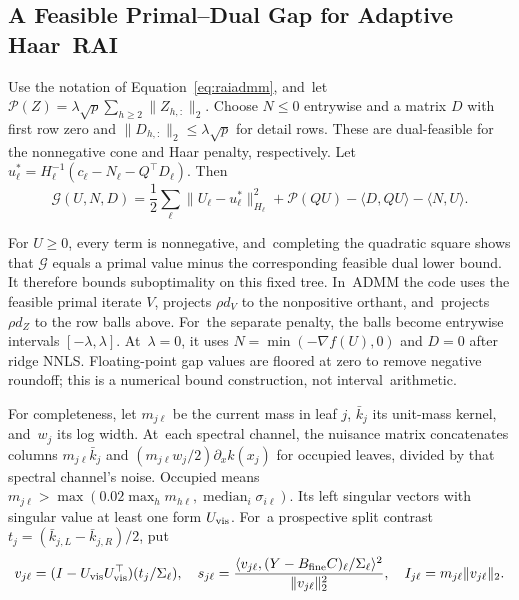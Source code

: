 \documentclass[mathematics,article,accept,moreauthors]{Definitions/mdpi}
\begin{document}
\subsection{A Feasible Primal--Dual Gap for Adaptive Haar~RAI}\label{app:haargap}
Use the notation of Equation~\eqref{eq:raiadmm}, and~let $\mathcal P(Z)=\lambda\sqrt p\sum_{h\geq2}\|Z_{h,:}\|_2$. Choose $N\leq0$ entrywise and a matrix $D$ with first row zero and $\|D_{h,:}\|_2\leq\lambda\sqrt p$ for detail rows. These are dual-feasible for the nonnegative cone and Haar penalty, respectively.
Let\linebreak   $u_\ell^*=H_\ell^{-1}(c_\ell-N_\ell-Q^\top D_\ell)$. Then
\begin{equation}\label{eq:haargap}
 \mathcal G(U,N,D)=\frac12\sum_\ell\|U_\ell-u_\ell^*\|_{H_\ell}^2
 +\mathcal P(QU)-\langle D,QU\rangle-\langle N,U\rangle.
\end{equation}

For $U\geq0$, every term is nonnegative, and~completing the quadratic square shows that $\mathcal G$ equals a primal value minus the corresponding feasible dual lower bound. It therefore bounds suboptimality on this fixed tree. In~ADMM the code uses the feasible primal iterate $V$, projects $\rho d_V$ to the nonpositive orthant, and~projects $\rho d_Z$ to the row balls above. For~the separate penalty, the balls become entrywise intervals $[-\lambda,\lambda]$. At~$\lambda=0$, it uses $N=\min(-\nabla f(U),0)$ and $D=0$ after ridge NNLS. Floating-point gap values are floored at zero to remove negative roundoff; this is a numerical bound construction, not interval~arithmetic.

For completeness, let $m_{j\ell}$ be the current mass in leaf $j$, $\bar k_j$ its unit-mass kernel, and~$w_j$ its log width. At~each spectral channel, the nuisance matrix concatenates columns $m_{j\ell}\bar k_j$ and $(m_{j\ell}w_j/2)\partial_x k(x_j)$ for occupied leaves, divided by that spectral channel's noise. Occupied means $m_{j\ell}>\max(0.02\max_hm_{h\ell},\operatorname{median}_i\sigma_{i\ell})$. Its left singular vectors with singular value at least one form $U_{\rm vis}$. For~a prospective split contrast $t_j=(\bar k_{j,L}-\bar k_{j,R})/2$, put
\begin{equation}\label{eq:haarscore}
 v_{j\ell}=(I-U_{\rm vis}U_{\rm vis}^\top)(t_j/\Sigma_\ell),\quad
 s_{j\ell}=\frac{\langle v_{j\ell},(Y-B_{\rm fine}C)_\ell/\Sigma_\ell\rangle^2}
 {\|v_{j\ell}\|_2^2},\quad I_{j\ell}=m_{j\ell}\|v_{j\ell}\|_2.
\end{equation}
\end{document}
